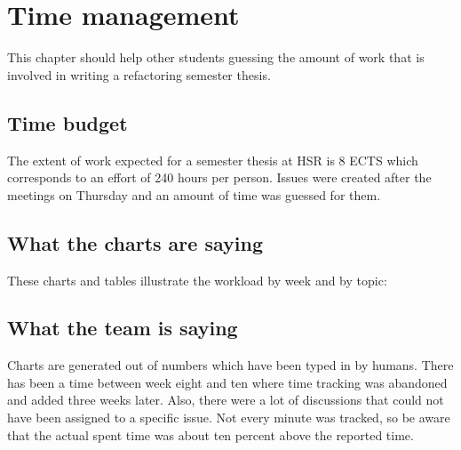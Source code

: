 \chapter{Time management}
\thispagestyle{fancy}
This chapter should help other students guessing the amount of work that is 
involved in writing a refactoring semester thesis.

\section{Time budget}
The extent of work expected for a semester thesis at HSR is 8 ECTS which 
corresponds to an effort of 240 hours per person. Issues were created after 
the meetings on Thursday and an amount of time was guessed for them. 

\section{What the charts are saying}
These charts and tables illustrate the workload by week and by topic:

\section{What the team is saying}
Charts are generated out of numbers which have been typed in by humans. There 
has been a time between week eight and ten where time tracking was abandoned and 
added three weeks later. Also, there were a lot of discussions that could not 
have been assigned to a specific issue. Not every minute was tracked, so be 
aware that the actual spent time was about ten percent above the reported time.
